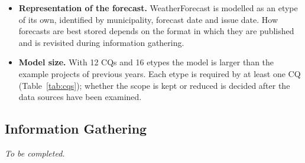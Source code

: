 \begin{itemize}
    \item \textbf{Representation of the forecast.} WeatherForecast is modelled as an etype of its own, identified by municipality, forecast date and issue date. How forecasts are best stored depends on the format in which they are published and is revisited during information gathering.
    \item \textbf{Model size.} With 12 CQs and 16 etypes the model is larger than the example projects of previous years. Each etype is required by at least one CQ (Table~\ref{tab:cqs}); whether the scope is kept or reduced is decided after the data sources have been examined.
\end{itemize}

\subsection{Information Gathering}
\label{sec:info-gathering}
\textit{To be completed.}

